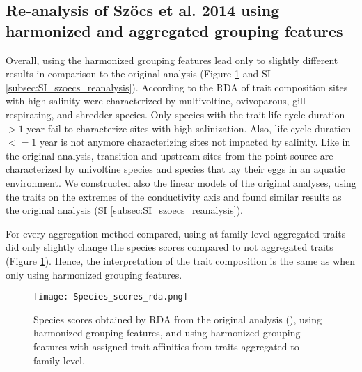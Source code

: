 \documentclass[../Draft_harmonization_paper.tex]{subfiles}
\begin{document}

\subsection*{Re-analysis of Szöcs et al. 2014 using harmonized and aggregated grouping features}

Overall, using the harmonized grouping features lead only to slightly different results in comparison to the original analysis (Figure \ref{fig:rda_species_scores} and SI \ref{subsec:SI_szoecs_reanalysis}). According to the RDA of trait composition sites with high salinity were characterized by multivoltine, ovivoparous, gill-respirating, and shredder species. Only species with the trait life cycle duration $> 1$ year fail to characterize sites with high salinization. Also, life cycle duration $<= 1$ year is not anymore characterizing sites not impacted by salinity. Like in the original analysis, transition and upstream sites from the point source are characterized by univoltine species and species that lay their eggs in an aquatic environment. We constructed also the linear models of the original analyses, using the traits on the extremes of the conductivity axis and found similar results as the original analysis (SI \ref{subsec:SI_szoecs_reanalysis}).

For every aggregation method compared, using at family-level aggregated traits did only slightly change the species scores compared to not aggregated traits (Figure \ref{fig:rda_species_scores}). Hence, the interpretation of the trait composition is the same as when only using harmonized grouping features. 
 

\begin{figure}[H]
    \label{fig:rda_species_scores}
    \centering
    \texttt{[image: Species\_scores\_rda.png]}
    \caption{Species scores obtained by RDA from the original analysis (\cite{szocs_effects_2014}), using harmonized grouping features, and using harmonized grouping features with assigned trait affinities from traits aggregated to family-level.}
    \label{fig:rda_species_scores}
\end{figure}
\end{document}
